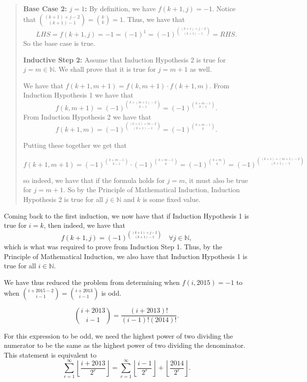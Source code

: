 \documentclass{article}
\begin{document}
\begin{enumerate}
\begin{quote}
\textbf{Base Case 2: $j = 1$:} By definition, we have $f(k + 1, j) = -1$. Notice that $\binom{(k + 1) + j - 2}{(k + 1) - 1} = \binom{k}{k} = 1$. Thus, we have that
$$LHS = f(k + 1, j) = -1 = (-1)^1 = (-1)^{\binom{(k + 1) + j - 2}{(k + 1) - 1}} = RHS.$$
So the base case is true.

\textbf{Inductive Step 2:} Assume that Induction Hypothesis 2 is true for $j = m \in \mathbb{N}$. We shall prove that it is true for $j = m + 1$ as well.

We have that $f(k + 1, m + 1) = f(k, m + 1) \cdot f(k + 1, m)$. From Induction Hypothesis 1 we have that 
$$f(k, m + 1) = (-1)^{\binom{k + (m + 1) - 2}{k - 1}} = (-1)^{\binom{k + m - 1}{k - 1}}.$$
From Induction Hypothesis 2 we have that
$$f(k + 1, m) = (-1)^{\binom{(k + 1) + m - 2}{(k + 1) - 1}} = (-1)^{\binom{k + m - 1}{k}}.$$

Putting these together we get that

$$f(k + 1, m + 1) = (-1)^{\binom{k + m - 1}{k - 1}} \cdot (-1)^{\binom{k + m - 1}{k}} = (-1)^{\binom{k + m}{k}} = (-1)^{\binom{(k + 1) + (m + 1) - 2}{(k + 1) - 1}}$$

so indeed, we have that if the formula holds for $j = m$, it must also be true for $j = m + 1$. So by the Principle of Mathematical Induction, Induction Hypothesis 2 is true for all $j \in \mathbb{N}$ and $k$ is some fixed value.
\end{quote}

Coming back to the first induction, we now have that if Induction Hypothesis 1 is true for $i = k$, then indeed, we have that
\[ f(k + 1, j) = (-1)^{\binom{(k + 1) + j - 2}{(k + 1) - 1}} \quad \forall j \in \mathbb{N}, \]
which is what was required to prove from Induction Step 1.
Thus, by the Principle of Mathematical Induction, we also have that Induction Hypothesis 1 is true for all $i \in \mathbb{N}$.

We have thus reduced the problem from determining when $f(i, 2015) = -1$ to when $\displaystyle \binom{i + 2015 - 2}{i - 1} = \binom{i + 2013}{i - 1}$ is odd.

$$\binom{i + 2013}{i - 1} = \frac{(i + 2013)!}{(i - 1)!(2014)!}.$$

For this expression to be odd, we need the highest power of two dividing the numerator to be the same as the highest power of two dividing the denominator. This statement is equivalent to
$$\sum_{r = 1}^{\infty} \left\lfloor{\frac{i + 2013}{2^r}}\right\rfloor = \sum_{r = 1}^{\infty} \left\lfloor \frac{i - 1}{2^r} \right\rfloor + \left\lfloor \frac{2014}{2^r} \right\rfloor.$$


\end{enumerate}
\end{document}
